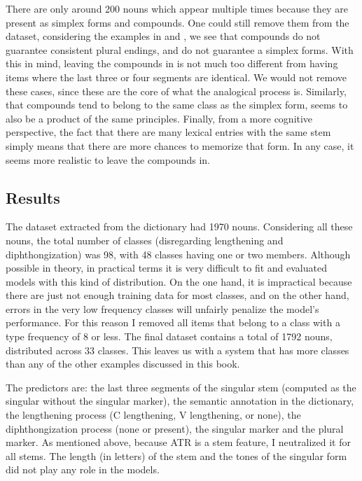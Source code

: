 There are only around 200 nouns which appear multiple times because they are present as simplex forms and compounds. One could still remove them from the dataset, considering the examples in  and , we see that compounds do not guarantee consistent plural endings, and do not guarantee a simplex forms. With this in mind, leaving the compounds in is not much too different from having items where the last three or four segments are identical. We would not remove these cases, since these are the core of what the analogical process is. Similarly, that compounds tend to belong to the same class as the simplex form, seems to also be a product of the same principles. Finally, from a more cognitive perspective, the fact that there are many lexical entries with the same stem simply means that there are more chances to memorize that form. In any case, it seems more realistic to leave the compounds in.

\subsection{Results}

The dataset extracted from the dictionary had 1970 nouns. Considering all these nouns, the total number of classes (disregarding lengthening and diphthongization) was 98, with 48 classes having one or two members. Although possible in theory, in practical terms it is very difficult to fit and evaluated models with this kind of distribution. On the one hand, it is impractical because there are just not enough training data for most classes, and on the other hand, errors in the very low frequency classes will unfairly penalize the model's performance. For this reason I removed all items that belong to a class with a type frequency of 8 or less. The final dataset contains a total of 1792 nouns, distributed across 33 classes. This leaves us with a system that has more classes than any of the other examples discussed in this book.

The predictors are: the last three segments of the singular stem (computed as the singular without the singular marker), the semantic annotation in the dictionary, the lengthening process (C lengthening, V lengthening, or none), the diphthongization process (none or present), the singular marker and the plural marker. As mentioned above, because ATR is a stem feature, I neutralized it for all stems. The length (in letters) of the stem and the tones of the singular form did not play any role in the models.

